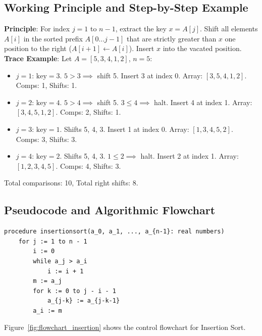 \documentclass[11pt,a4paper,oneside]{report}
\theoremstyle{definition}
\begin{document}
\subsection{Working Principle and Step-by-Step Example}
\textbf{Principle}: For index $j = 1$ to $n-1$, extract the key $x = A[j]$. Shift all elements $A[i]$ in the sorted prefix $A[0 \dots j-1]$ that are strictly greater than $x$ one position to the right ($A[i+1] \leftarrow A[i]$). Insert $x$ into the vacated position.
\textbf{Trace Example}: Let $A = [5, 3, 4, 1, 2]$, $n = 5$:
\begin{itemize}
    \item $j = 1$: $\text{key} = 3$. $5 > 3 \implies$ shift 5. Insert 3 at index 0. Array: $[3, 5, 4, 1, 2]$. Comps: 1, Shifts: 1.
    \item $j = 2$: $\text{key} = 4$. $5 > 4 \implies$ shift 5. $3 \le 4 \implies$ halt. Insert 4 at index 1. Array: $[3, 4, 5, 1, 2]$. Comps: 2, Shifts: 1.
    \item $j = 3$: $\text{key} = 1$. Shifts 5, 4, 3. Insert 1 at index 0. Array: $[1, 3, 4, 5, 2]$. Comps: 3, Shifts: 3.
    \item $j = 4$: $\text{key} = 2$. Shifts 5, 4, 3. $1 \le 2 \implies$ halt. Insert 2 at index 1. Array: $[1, 2, 3, 4, 5]$. Comps: 4, Shifts: 3.
\end{itemize}
Total comparisons: 10, Total right shifts: 8.

\subsection{Pseudocode and Algorithmic Flowchart}
\begin{lstlisting}[caption={Pseudocode: Insertion Sort (Rosen \S3.1, Algorithm 5)}]
procedure insertionsort(a_0, a_1, ..., a_{n-1}: real numbers)
    for j := 1 to n - 1
        i := 0
        while a_j > a_i
            i := i + 1
        m := a_j
        for k := 0 to j - i - 1
            a_{j-k} := a_{j-k-1}
        a_i := m
\end{lstlisting}

Figure~\ref{fig:flowchart_insertion} shows the control flowchart for Insertion Sort.
\end{document}
